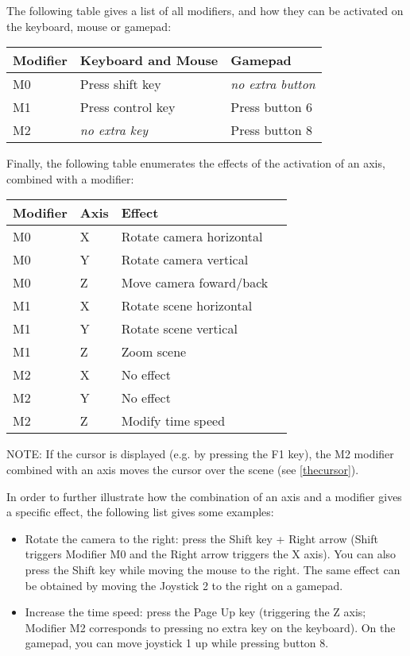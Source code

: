 The following table gives a list of all modifiers, and how they can be activated on the keyboard, mouse or gamepad:

\begin{tabular}{l l l}
\hline
Modifier & Keyboard and Mouse & Gamepad \\ \hline
M0 & Press shift key & \textit{no extra button} \\
M1 & Press control key & Press button 6 \\
M2 & \textit{no extra key} & Press button 8 \\
\hline
\end{tabular}

Finally, the following table enumerates the effects of the activation of an axis, combined with a modifier:

\begin{tabular}{l l l l}
\hline
Modifier & Axis & Effect \\ \hline
M0 & X & Rotate camera horizontal \\
M0 & Y & Rotate camera vertical \\
M0 & Z & Move camera foward/back \\
M1 & X & Rotate scene horizontal \\
M1 & Y & Rotate scene vertical \\
M1 & Z & Zoom scene \\
M2 & X & No effect \\
M2 & Y & No effect \\
M2 & Z & Modify time speed  \\
\hline
\end{tabular}

NOTE: If the cursor is displayed (e.g. by pressing the F1 key), the M2 modifier combined with an axis moves the cursor over the scene (see \ref{thecursor}).

In order to further illustrate how the combination of an axis and a modifier gives a specific effect, the following list gives some examples:
\begin{itemize}
\item Rotate the camera to the right: press the Shift key + Right arrow (Shift triggers Modifier M0 and the Right arrow triggers the X axis). You can also press the Shift key while moving the mouse to the right. The same effect can be obtained by moving the Joystick 2 to the right on a gamepad.
\item Increase the time speed: press the Page Up key (triggering the Z axis; Modifier M2 corresponds to pressing no extra key on the keyboard). On the gamepad, you can move joystick 1 up while pressing button 8.
\end{itemize}

